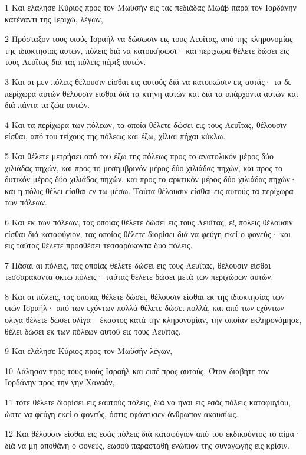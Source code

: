 \par 1 Και ελάλησε Κύριος προς τον Μωϋσήν εις τας πεδιάδας Μωάβ παρά τον Ιορδάνην κατέναντι της Ιεριχώ, λέγων,
\par 2 Πρόσταξον τους υιούς Ισραήλ να δώσωσιν εις τους Λευΐτας, από της κληρονομίας της ιδιοκτησίας αυτών, πόλεις διά να κατοικήσωσι· και περίχωρα θέλετε δώσει εις τους Λευΐτας διά τας πόλεις πέριξ αυτών.
\par 3 Και αι μεν πόλεις θέλουσιν είσθαι εις αυτούς διά να κατοικώσιν εις αυτάς· τα δε περίχωρα αυτών θέλουσιν είσθαι διά τα κτήνη αυτών και διά τα υπάρχοντα αυτών και διά πάντα τα ζώα αυτών.
\par 4 Και τα περίχωρα των πόλεων, τα οποία θέλετε δώσει εις τους Λευΐτας, θέλουσιν είσθαι, από του τείχους της πόλεως και έξω, χίλιαι πήχαι κύκλω.
\par 5 Και θέλετε μετρήσει από του έξω της πόλεως προς το ανατολικόν μέρος δύο χιλιάδας πηχών, και προς το μεσημβρινόν μέρος δύο χιλιάδας πηχών, και προς το δυτικόν μέρος δύο χιλιάδας πηχών, και προς το αρκτικόν μέρος δύο χιλιάδας πηχών· και η πόλις θέλει είσθαι εν τω μέσω. Ταύτα θέλουσιν είσθαι εις αυτούς τα περίχωρα των πόλεων.
\par 6 Και εκ των πόλεων, τας οποίας θέλετε δώσει εις τους Λευΐτας, εξ πόλεις θέλουσιν είσθαι διά καταφύγιον, τας οποίας θέλετε διορίσει διά να φεύγη εκεί ο φονεύς· και εις ταύτας θέλετε προσθέσει τεσσαράκοντα δύο πόλεις.
\par 7 Πάσαι αι πόλεις, τας οποίας θέλετε δώσει εις τους Λευΐτας, θέλουσιν είσθαι τεσσαράκοντα οκτώ πόλεις· ταύτας θέλετε δώσει μετά των περιχώρων αυτών.
\par 8 Και αι πόλεις, τας οποίας θέλετε δώσει, θέλουσιν είσθαι εκ της ιδιοκτησίας των υιών Ισραήλ· από των εχόντων πολλά θέλετε δώσει πολλά, και από των εχόντων ολίγα θέλετε δώσει ολίγα· έκαστος κατά την κληρονομίαν, την οποίαν εκληρονόμησε, θέλει δώσει εκ των πόλεων αυτού εις τους Λευΐτας.
\par 9 Και ελάλησε Κύριος προς τον Μωϋσήν λέγων,
\par 10 Λάλησον προς τους υιούς Ισραήλ και ειπέ προς αυτούς, Όταν διαβήτε τον Ιορδάνην προς την γην Χαναάν,
\par 11 τότε θέλετε διορίσει εις εαυτούς πόλεις, διά να ήναι εις εσάς πόλεις καταφυγίου, ώστε να φεύγη εκεί ο φονεύς, όστις εφόνευσεν άνθρωπον ακουσίως.
\par 12 Και θέλουσιν είσθαι εις εσάς πόλεις διά καταφύγιον από του εκδικούντος το αίμα· διά να μη αποθάνη ο φονεύς, εωσού παρασταθή ενώπιον της συναγωγής εις κρίσιν.

